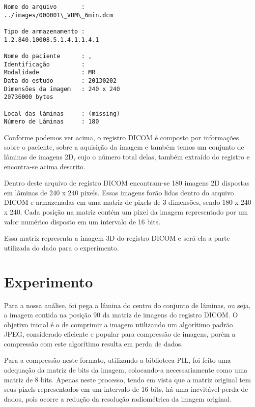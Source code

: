 \documentclass{IEEEtran}
\begin{document}
    \begin{Verbatim}[commandchars=\\\{\}]
Nome do arquivo       :
../images/000001\_VBM\_6min.dcm

Tipo de armazenamento :
1.2.840.10008.5.1.4.1.1.4.1

Nome do paciente      : , 
Identificação         : 
Modalidade            : MR
Data do estudo        : 20130202
Dimensões da imagem   : 240 x 240
20736000 bytes

Local das lâminas     : (missing)
Número de Lâminas     : 180

    \end{Verbatim}

    Conforme podemos ver acima, o registro DICOM é composto por informações
sobre o paciente, sobre a aquisição da imagem e também temos um conjunto
de lâminas de imagens 2D, cujo o número total delas, também extraído do
registro e encontra-se acima descrito.

Dentro deste arquivo de registro DICOM encontram-se 180 imagens 2D
dispostas em lâminas de 240 x 240 pixels. Essas imagens forão lidas
dentro do arquivo DICOM e armazenadas em uma matriz de pixels de 3
dimensões, sendo 180 x 240 x 240. Cada posição na matriz contém um pixel
da imagem representado por um valor numérico disposto em um intervalo de
16 bits.

Essa matriz representa a imagem 3D do registro DICOM e será ela a parte
utilizada do dado para o experimento.

    \section{Experimento}\label{experimento}

    Para a nossa análise, foi pega a lâmina do centro do conjunto de
lâminas, ou seja, a imagem contida na posição 90 da matriz de imagens do
registro DICOM. O objetivo inicial é o de comprimir a imagem utilizando
um algorítimo padrão JPEG, considerado eficiente e popular para
compressão de imagens, porém a compressão com este algorítimo resulta em
perda de dados. 


    Para a compressão neste formato, utilizando a biblioteca PIL, foi feito
uma adequação da matriz de bits da imagem, colocando-a necessariamente
como uma matriz de 8 bits. Apenas neste processo, tendo em vista que a
matriz original tem seus pixels representados em um intervalo de 16
bits, há uma inevitável perda de dados, pois ocorre a redução da
resolução radiométrica da imagem original.
\end{document}
